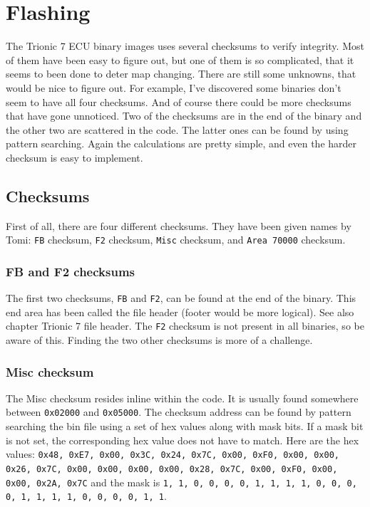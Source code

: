 \documentclass[11pt,a4paper]{book}
\begin{document}
\chapter{Flashing}
The Trionic 7 ECU binary images uses several checksums to verify integrity. Most
of them have been easy to figure out, but one of them is so complicated, that it
seems to been done to deter map changing. There are still some unknowns, that
would be nice to figure out. For example, I've discovered some binaries don't
seem to have all four checksums. And of course there could be more checksums
that have gone unnoticed. Two of the checksums are in the end of the binary and
the other two are scattered in the code. The latter ones can be found by using
pattern searching. Again the calculations are pretty simple, and even the harder
checksum is easy to implement.

\section{Checksums}
First of all, there are four different checksums. They have been given names by
Tomi: \texttt{FB} checksum,
\texttt{F2} checksum,
\texttt{Misc} checksum, and \texttt{Area 70000}
checksum.

\subsection{FB and F2 checksums}\label{sec:FBF2Checksum}
The first two checksums, \texttt{FB} and \texttt{F2}, can be found at the end of
the binary. This end area has been called the file header (footer would be more
logical). See also chapter Trionic 7 file header. The
\texttt{F2} checksum is not present in all binaries, so be aware of this.
Finding the two other checksums is more of a challenge.

\subsection{Misc checksum}
The Misc checksum resides inline within the code. It is usually found somewhere
between \texttt{0x02000} and \texttt{0x05000}. The checksum address can be found
by pattern searching the bin file using a set of hex values along with mask
bits. If a mask bit is not set, the corresponding hex value does not have to
match. Here are the hex values: \texttt{0x48, 0xE7, 0x00, 0x3C, 0x24, 0x7C,
    0x00, 0xF0, 0x00, 0x00, 0x26, 0x7C, 0x00, 0x00, 0x00, 0x00, 0x28, 0x7C,
    0x00, 0xF0, 0x00, 0x00, 0x2A, 0x7C} and the mask is \texttt{1, 1, 0, 0, 0,
0, 1, 1, 1, 1, 0, 0, 0, 0, 1, 1, 1, 1, 0, 0, 0, 0, 1, 1}.
\end{document}
